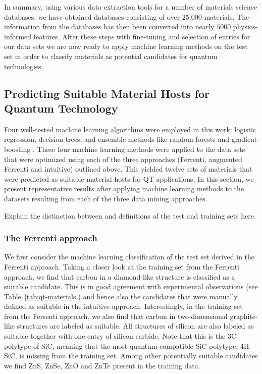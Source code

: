 \documentclass[superscriptaddress,unsortedaddress,
 amsmath,amssymb,
 aps,
]{revtex4-2}
\begin{document}
In summary, using various
data extraction tools for a number of materials science databases, we have obtained databases consisting of over $25.000$ materials. The information from the databases has then been converted into nearly $5000$ physics-informed features. 
After these steps with fine-tuning and selection of entries for our data sets we are now ready to apply machine learning methods on the test set in order to classify materials as potential candidates for quantum technologies. 

\subsection*{Predicting Suitable Material Hosts for Quantum Technology} 
Four well-tested machine learning algorithms were employed in this work: logistic regression, decision trees, and ensemble methods like random forests and gradient boosting \cite{Mehta2019,Hastie2009}. 
These four machine learning methods were applied to the data sets that were optimized using each of the three approaches (Ferrenti, augmented Ferrenti and intuitive) outlined above. This yielded twelve sets of materials that were predicted as suitable material hosts for QT applications. In this section, we present representative results after applying machine learning methods to the datasets resulting from each of the three data mining approaches. 

Explain the distinction between and definitions of the test and training sets here. 

\subsubsection*{The Ferrenti approach}
We first consider the machine learning classification of the test set derived in the Ferrenti approach. 
Taking a closer look at the training set from the Ferrenti approach, we find that carbon in a diamond-like structure is classified as a suitable candidate. 
This is in good agreement with experimental observations (see Table~\ref{tab:qt-materials}) and hence also the candidates that were manually defined as suitable in the intuitive approach.  
Interestingly, in the training set from the Ferrenti approach, we also find that carbon in two-dimensional graphite-like structures are labeled as suitable. 
All structures of silicon are also labeled as suitable together with one entry of silicon carbide. Note that this is the 3C polytype of SiC, meaning that the most quantum compatible SiC polytype, 4H-SiC, is missing from the training set. Among other potentially suitable candidates we find ZnS, ZnSe, ZnO and ZnTe present in the training data. 
\end{document}
